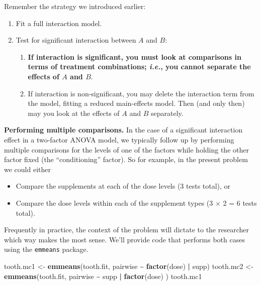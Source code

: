 \documentclass[
]{book}
\newenvironment{Shaded}{\begin{snugshade}}{\end{snugshade}}
\newcommand{\FunctionTok}[1]{\textcolor[rgb]{0.13,0.29,0.53}{\textbf{#1}}}
\newcommand{\NormalTok}[1]{#1}
\newcommand{\OtherTok}[1]{\textcolor[rgb]{0.56,0.35,0.01}{#1}}
\newcommand{\SpecialCharTok}[1]{\textcolor[rgb]{0.81,0.36,0.00}{\textbf{#1}}}
\providecommand{\tightlist}{%
  \setlength{\itemsep}{0pt}\setlength{\parskip}{0pt}}
\begin{document}
Remember the strategy we introduced earlier:

\begin{enumerate}
\def\labelenumi{\arabic{enumi}.}
\tightlist
\item
  Fit a full interaction model.
\item
  Test for significant interaction between \(A\) and \(B\):

  \begin{enumerate}
  \def\labelenumii{\alph{enumii}.}
  \tightlist
  \item
    \textbf{If interaction is significant, you must look at comparisons in terms of treatment combinations; \emph{i.e.}, you cannot separate the effects of \(A\) and \(B\)}.
  \item
    If interaction is non-significant, you may delete the interaction term from the model, fitting a reduced main-effects model. Then (and only then) may you look at the effects of \(A\) and \(B\) separately.
  \end{enumerate}
\end{enumerate}

\textbf{Performing multiple comparisons. }In the case of a significant interaction effect in a two-factor ANOVA model, we typically follow up by performing multiple comparisons for the levels of one of the factors while holding the other factor fixed (the ``conditioning'' factor).
So for example, in the present problem we could either

\begin{itemize}
\tightlist
\item
  Compare the supplements at each of the dose levels (3 tests total), or
\item
  Compare the dose levels within each of the supplement types (3 × 2 = 6 tests total).
\end{itemize}

Frequently in practice, the context of the problem will dictate to the researcher which way makes the most sense.
We'll provide code that performs both cases using the \texttt{emmeans} package.

\begin{Shaded}
\begin{Highlighting}[]
\NormalTok{tooth.mc1 }\OtherTok{\textless{}{-}} \FunctionTok{emmeans}\NormalTok{(tooth.fit, pairwise }\SpecialCharTok{\textasciitilde{}} \FunctionTok{factor}\NormalTok{(dose) }\SpecialCharTok{|}\NormalTok{ supp)}
\NormalTok{tooth.mc2 }\OtherTok{\textless{}{-}} \FunctionTok{emmeans}\NormalTok{(tooth.fit, pairwise }\SpecialCharTok{\textasciitilde{}}\NormalTok{ supp }\SpecialCharTok{|} \FunctionTok{factor}\NormalTok{(dose) )}
\NormalTok{tooth.mc1}
\end{Highlighting}
\end{Shaded}
\end{document}
